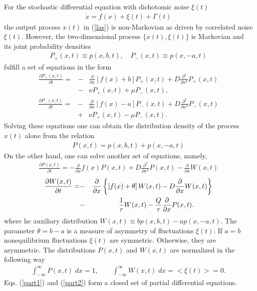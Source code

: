 \documentclass[authoryear,draft,1p,times]{elsarticle}
\renewcommand{\=}{\stackrel{\mathrm{d}}{=}}
\begin{document}
For the stochastic differential equation with dichotomic noise  $\xi(t)$ 
%
\begin{eqnarray}  \label{las}
\dot x = f(x) + \xi(t)+ \Gamma (t) 
\end{eqnarray}
%
the output process $x(t)$ in (\ref{las})
is non-Markovian as driven by correlated noise $\xi(t)$.
However, the two-dimensional process $\{x(t), \xi(t)\}$ is
Markovian and its joint probability densities
%
\begin{eqnarray}  \label{pra}
P_{+}(x,t)\equiv p(x,b,t),\quad P_{-}(x,t)\equiv p(x,-a,t)
\end{eqnarray}
%
fulfill a set of equations in the form \cite{bro}
%
\begin{eqnarray}  \label{m1}
{\frac{\partial P_{+}(x,t)}{\partial t}}=&-&{\frac \partial {\partial x}}%
\left[f(x)+b\right]P_{+}(x,t)+D{\frac{\partial ^2}{\partial x^2}}%
P_{+}(x,t)\nonumber\\
&-&\nu P_{+}(x,t)+\mu P_{-}(x,t),
\end{eqnarray}
%
\begin{eqnarray}  \label{m2}
{\frac{\partial P_{-}(x,t)}{\partial t}}=&-&{\frac \partial {\partial x}}%
\left[f(x)-a\right]P_{-}(x,t)+D{\frac{\partial ^2}{\partial x^2}}P_{-}(x,t)
\nonumber\\
&+&\nu P_{+}(x,t)-\mu P_{-}(x,t).
\end{eqnarray}
%
Solving these equations one can obtain the distribution density
of the process $x(t)$ alone  from the relation 
%
\begin{eqnarray}  \label{pel}
P(x,t) =  p(x,b,t)+p(x,-a,t)  
\end{eqnarray}
%
On the other hand, one can solve another set of equations, namely,  
%
\begin{eqnarray}  \label{part1}
{\frac{\partial P(x,t)}{\partial t}}=-\frac{\partial} {\partial x} 
f(x)P(x, t) + D \frac{\partial^2 }{\partial x^2} P(x,t) -\frac{\partial} {\partial x} W(x, t)
\end{eqnarray}
%
%
\begin{eqnarray}  \label{part2}
{\frac{\partial W(x, t) }{\partial t}} = &-& {\frac{\partial }{\partial x}}
\left\{\left[f(x) + \theta\right] W(x, t) -D {\frac{\partial}{\partial x}}
W(x, t) \right\}  \nonumber \\
&-& {\frac{1}{\tau}} W(x, t) - {\frac{Q}{\tau}} {\frac{\partial }{%
\partial x}}P(x, t).\qquad \ \
\end{eqnarray}
%
where he auxiliary distribution
$W(x,t)\equiv bp(x,b,t)-ap(x,-a,t)$.  
The parameter $\theta=b-a$ is a measure of asymmetry of
fluctuations $\xi(t)$:
If $a=b$ nonequilibrium fluctuations $\xi(t)$ are symmetric. Otherwise,
they are asymmetric.
The distributions $P(x, t)$ and $W(x, t)$ are normalized in
the following way
%
\begin{eqnarray}  \label{nor1}
\int_{-\infty}^{\infty} P(x, t) \;dx = 1, \qquad
\int_{-\infty}^{\infty} W(x, t) \;dx = <\xi(t)> = 0. 
\end{eqnarray}
%
Eqs. (\ref{part1}) and (\ref{part2}) form a closed set of partial
differential equations.
\end{document}
